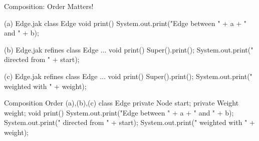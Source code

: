 \begin{frame}[fragile]{Composition: Order Matters!}
	\pause
	\begin{mycolumns}[widths={50,50},animation=none]
{\tiny
\begin{codetight}{(a) Edge.jak}
class Edge {
	void print() {
		System.out.print("Edge between " + a + " and " + b);
	}
}
\end{codetight}
\begin{codetight}{(b) Edge.jak}
refines class Edge {
	...
	void print() {
		Super().print();
		System.out.print(" directed from " + start);
	}
}
\end{codetight}
\begin{codetight}{(c) Edge.jak}
refines class Edge {
	...
	void print() {
		Super().print();
		System.out.print(" weighted with " + weight);
	}
}
\end{codetight}
}
	\mynextcolumn
		\pause
\begin{codetight}{Composition Order (a),(b),(c)}
class Edge {
	private Node start;
	private Weight weight;
	void print() {
		System.out.print("Edge between " + a + " and " + b);
		System.out.print(" directed from " + start);
		System.out.print(" weighted with " + weight);
	}
}
\end{codetight}
	\end{mycolumns}
\end{frame}

